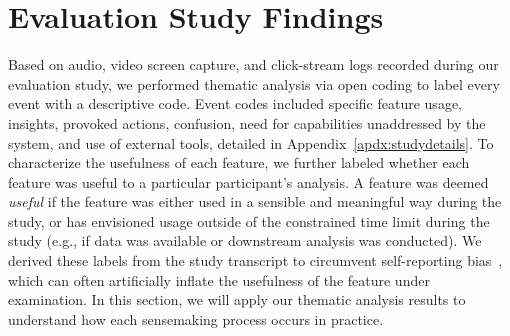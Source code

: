  \section{Evaluation Study Findings\label{sec:eval_findings}}
 Based on audio, video screen capture,
 and click-stream logs recorded
 during our evaluation study,
 we performed thematic analysis via open coding to label every event with a descriptive code. Event codes included specific feature usage,
 insights,
 provoked actions, confusion,
 need for capabilities unaddressed
 by the system, and use of external tools, detailed in Appendix~\ref{apdx:studydetails}. To characterize the usefulness
 of each feature, we further labeled whether each
 feature was useful to a particular participant's analysis.
 A feature was deemed \textit{useful}
 if the feature was either used in a sensible
 and meaningful way during the study,
 or has envisioned usage outside of the constrained
 time limit during the study
 (e.g., if data was available or downstream analysis was conducted).
 We derived these labels from the study transcript
 to circumvent self-reporting bias~\cite{Williams2017},
 which can often artificially inflate
 the usefulness of the feature under examination.
 In this section, we will apply our thematic analysis results to understand how each sensemaking process occurs in practice.%
